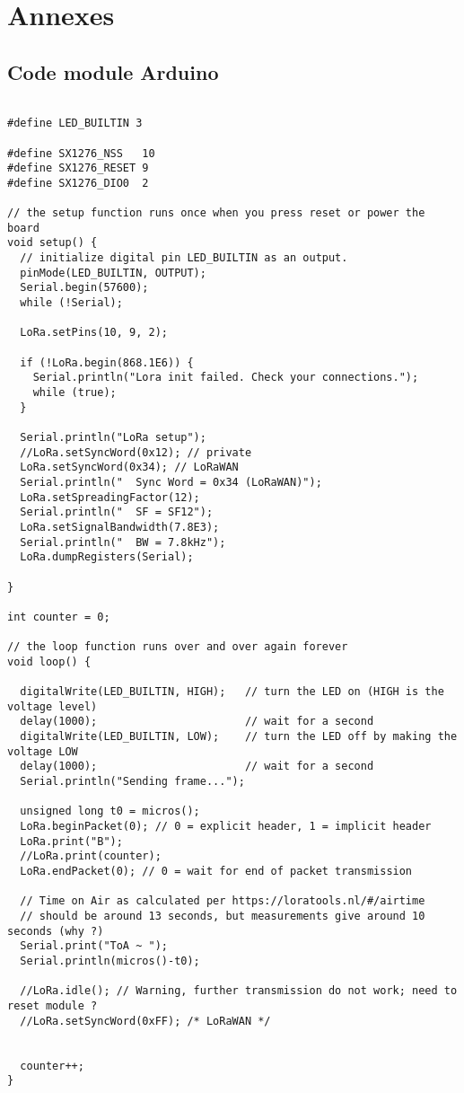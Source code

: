 \renewcommand{\leftmark}{ANNEXES}

\chapter{Annexes}

\section{Code module Arduino}\label{codearduino}

\begin{lstlisting}[style=cppstyle, caption={Module Arduino}, label={lst:cpp}]

#define LED_BUILTIN 3

#define SX1276_NSS   10
#define SX1276_RESET 9
#define SX1276_DIO0  2

// the setup function runs once when you press reset or power the board
void setup() {
  // initialize digital pin LED_BUILTIN as an output.
  pinMode(LED_BUILTIN, OUTPUT);
  Serial.begin(57600);
  while (!Serial);

  LoRa.setPins(10, 9, 2);

  if (!LoRa.begin(868.1E6)) {
    Serial.println("Lora init failed. Check your connections.");
    while (true);
  }

  Serial.println("LoRa setup");
  //LoRa.setSyncWord(0x12); // private
  LoRa.setSyncWord(0x34); // LoRaWAN
  Serial.println("  Sync Word = 0x34 (LoRaWAN)");
  LoRa.setSpreadingFactor(12);
  Serial.println("  SF = SF12");
  LoRa.setSignalBandwidth(7.8E3);
  Serial.println("  BW = 7.8kHz");
  LoRa.dumpRegisters(Serial);

}

int counter = 0;

// the loop function runs over and over again forever
void loop() {

  digitalWrite(LED_BUILTIN, HIGH);   // turn the LED on (HIGH is the voltage level)
  delay(1000);                       // wait for a second
  digitalWrite(LED_BUILTIN, LOW);    // turn the LED off by making the voltage LOW
  delay(1000);                       // wait for a second
  Serial.println("Sending frame...");

  unsigned long t0 = micros();
  LoRa.beginPacket(0); // 0 = explicit header, 1 = implicit header
  LoRa.print("B");
  //LoRa.print(counter);
  LoRa.endPacket(0); // 0 = wait for end of packet transmission

  // Time on Air as calculated per https://loratools.nl/#/airtime
  // should be around 13 seconds, but measurements give around 10 seconds (why ?)
  Serial.print("ToA ~ ");
  Serial.println(micros()-t0);

  //LoRa.idle(); // Warning, further transmission do not work; need to reset module ?
  //LoRa.setSyncWord(0xFF); /* LoRaWAN */


  counter++;
}
\end{lstlisting}

